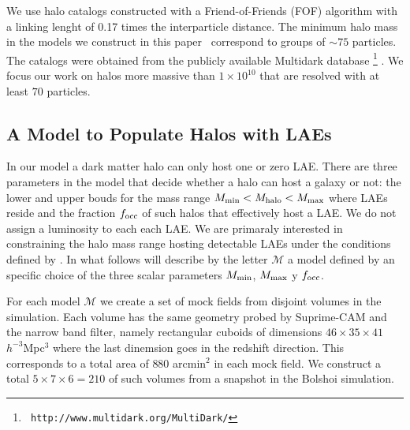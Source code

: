 \documentclass[usenatbib]{mn2e}
\newcommand{\documentname}{paper~}
\newcommand{\hMsun}{{\ifmmode{h^{-1}{\rm {M_{\odot}}}}\else{$h^{-1}{\rm{M_{\odot}}}$}\fi}}
\begin{document}
We use halo catalogs constructed with a Friend-of-Friends (FOF)
algorithm with a linking lenght of 0.17 times the interparticle
distance. 
The minimum halo mass in the models we construct in this \documentname
correspond to groups of $\sim 75$ particles. The catalogs were
obtained from the publicly available Multidark database \footnote{{\tt
    http://www.multidark.org/MultiDark/}} \citep{2011arXiv1109.0003R}.
We focus our work on halos more massive than $1\times 10^{10}$\hMsun
that are resolved with at least $70$ particles.


\subsection{A Model to Populate Halos with LAEs}
\label{subsec:mocks}

In our model a dark matter halo can only host one or zero LAE. 
There are three parameters in the model that decide whether a halo can host a
galaxy or not: the lower and upper bouds for the mass range $M_{\rm min}<
M_{\rm halo} < M_{\rm max}$ where LAEs reside and the fraction $f_{\rm
  occ}$ of such halos that effectively host a LAE. We do not assign a
luminosity to each each LAE. We are primaraly interested in
constraining the halo mass range hosting detectable LAEs under the
conditions defined by \cite{Yamada2012}. In what follows will describe by
the letter ${\mathcal M}$ a model defined by an specific choice of the
three scalar parameters $M_{\rm min}$, $M_{\rm  max}$ y $f_{\rm occ}$.  


For each model ${\mathcal M}$ we create a set of mock fields from
disjoint volumes in the simulation. Each volume has the same geometry
probed by Suprime-CAM and the narrow band filter, namely rectangular
cuboids of dimensions $46\times 35\times 41$ $h^{-3}$Mpc$^{3}$ where
the last dinemsion goes in the redshift direction. This corresponds to
a total area of $880$ arcmin$^{2}$ in each mock field. We construct a total
$5\times 7 \times 6=210$ of such volumes from a snapshot in the Bolshoi
simulation.   
\end{document}

